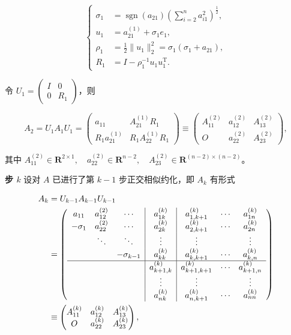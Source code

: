 \documentclass[
  10pt,
  fontset=fandol]{ctexart}
\begin{document}
\[
\left\{
\begin{aligned}
\sigma_1&=\operatorname{sgn}(a_{21})\left(\sum_{i=2}^na_{i1}^2\right)^{\frac12},\\
u_1&=a_{21}^{(1)}+\sigma_1e_1,\\
\rho_1&=\frac12\|u_1\|_2^2=\sigma_1(\sigma_1+a_{21}),\\
R_1&=I-\rho_1^{-1}u_1u_1^{\mathrm T}.
\end{aligned}
\right.
\tag{9.3.1}
\]

令 \(U_1=\begin{pmatrix}I&0\\0&R_1\end{pmatrix}\)，则

\[
A_2=U_1A_1U_1=\begin{pmatrix}
a_{11}&A_{21}^{(1)}R_1\\
R_1a_{21}^{(1)}&R_1A_{22}^{(1)}R_1
\end{pmatrix}
\equiv\begin{pmatrix}
A_{11}^{(2)}&a_{12}^{(2)}&A_{13}^{(2)}\\
O&a_{22}^{(2)}&A_{23}^{(2)}
\end{pmatrix},
\]

其中 \(A_{11}^{(2)}\in\mathbf R^{2\times1},\allowbreak \quad a_{22}^{(2)}\in\mathbf R^{n-2},\allowbreak \quad A_{23}^{(2)}\in\mathbf R^{(n-2)\times(n-2)}\)。

\textbf{步 \(k\)} 设对 \(A\) 已进行了第 \(k-1\) 步正交相似约化，即 \(A_k\) 有形式

\[
\begin{aligned}
A_k&=U_{k-1}A_{k-1}U_{k-1}\\
&=\left(\begin{array}{ccc|c|ccc}
a_{11}&a_{12}^{(2)}&\cdots&a_{1k}^{(k)}&a_{1,k+1}^{(k)}&\cdots&a_{1n}^{(k)}\\
-\sigma_1&a_{22}^{(2)}&\cdots&a_{2k}^{(k)}&a_{2,k+1}^{(k)}&\cdots&a_{2n}^{(k)}\\
&\ddots&\ddots&\vdots&\vdots&&\vdots\\
&&-\sigma_{k-1}&a_{kk}^{(k)}&a_{k,k+1}^{(k)}&\cdots&a_{k,n}^{(k)}\\\hline
&&&a_{k+1,k}^{(k)}&a_{k+1,k+1}^{(k)}&\cdots&a_{k+1,n}^{(k)}\\
&&&\vdots&\vdots&&\vdots\\
&&&a_{nk}^{(k)}&a_{n,k+1}^{(k)}&\cdots&a_{nn}^{(k)}
\end{array}\right)\\
&\equiv\begin{pmatrix}
A_{11}^{(k)}&a_{12}^{(k)}&A_{13}^{(k)}\\
O&a_{22}^{(k)}&A_{23}^{(k)}
\end{pmatrix},
\end{aligned}
\]
\end{document}
